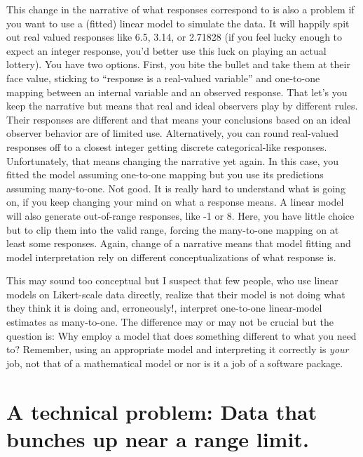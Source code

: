 \documentclass[
]{book}
\begin{document}
This change in the narrative of what responses correspond to is also a problem if you want to use a (fitted) linear model to simulate the data. It will happily spit out real valued responses like 6.5, 3.14, or 2.71828 (if you feel lucky enough to expect an integer response, you'd better use this luck on playing an actual lottery). You have two options. First, you bite the bullet and take them at their face value, sticking to ``response is a real-valued variable'' and one-to-one mapping between an internal variable and an observed response. That let's you keep the narrative but means that real and ideal observers play by different rules. Their responses are different and that means your conclusions based on an ideal observer behavior are of limited use. Alternatively, you can round real-valued responses off to a closest integer getting discrete categorical-like responses. Unfortunately, that means changing the narrative yet again. In this case, you fitted the model assuming one-to-one mapping but you use its predictions assuming many-to-one. Not good. It is really hard to understand what is going on, if you keep changing your mind on what a response means. A linear model will also generate out-of-range responses, like -1 or 8. Here, you have little choice but to clip them into the valid range, forcing the many-to-one mapping on at least some responses. Again, change of a narrative means that model fitting and model interpretation rely on different conceptualizations of what response is.

This may sound too conceptual but I suspect that few people, who use linear models on Likert-scale data directly, realize that their model is not doing what they think it is doing and, erroneously!, interpret one-to-one linear-model estimates as many-to-one. The difference may or may not be crucial but the question is: Why employ a model that does something different to what you need to? Remember, using an appropriate model and interpreting it correctly is \emph{your} job, not that of a mathematical model or nor is it a job of a software package.

\hypertarget{a-technical-problem-data-that-bunches-up-near-a-range-limit.}{%
\section{A technical problem: Data that bunches up near a range limit.}\label{a-technical-problem-data-that-bunches-up-near-a-range-limit.}}
\end{document}
